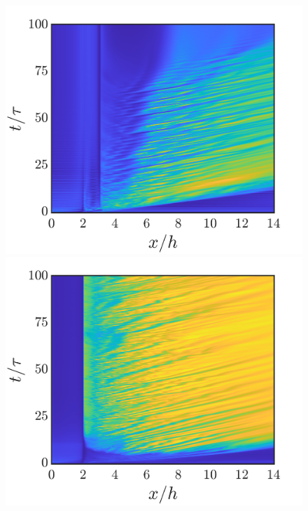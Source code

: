 \documentclass[reprint,a4paper,fleqn]{cas-dc} %
\begin{document}
\begin{figure}[t]
\begin{minipage}[c]{0.24\linewidth}
				\includegraphics[width=1\linewidth,trim={1.6cm 2cm 2cm 1cm},clip]{Figures/MI_HL/spcaeTime_M_2a.png}
				\includegraphics[width=1\linewidth,trim={1.6cm 2cm 2cm 1cm},clip]{Figures/MI_HL/spcaeTime_M_0a.png}
			\end{minipage}
			\begin{minipage}[c]{0.24\linewidth}

\end{minipage}
\end{figure}
\end{document}
